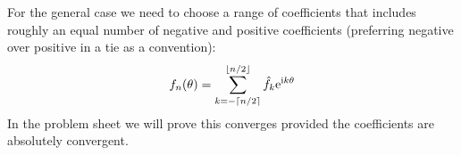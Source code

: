 For the general case we need to choose a range of coefficients that includes roughly an equal number of negative and positive coefficients (preferring negative over positive in a tie as a convention):
\[
f_n(\theta) = \sum_{k=-\lceil n/2\rceil}^{\lfloor n/2\rfloor} \hat f_k {\rm e}^{{\rm i} k \theta}
\]
In the problem sheet we will prove this converges provided the coefficients are absolutely convergent.



